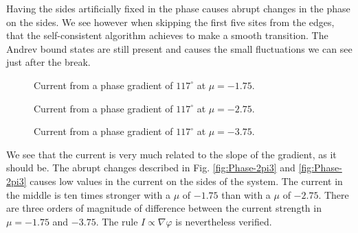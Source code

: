 \documentclass[..\main.tex]{subfile}
\begin{document}
Having the sides artificially fixed in the phase causes abrupt changes in the phase on the sides. We see however when skipping the first
 five sites from the edges, that the self-consistent
algorithm achieves to make a smooth transition. The Andrev bound states are still present and causes the small fluctuations we can see just after the
break.\\
\begin{figure}[H]
    
    \caption{Current from a phase gradient of $117^{\circ}$ at $\mu = -1.75$.}
\end{figure}
\begin{figure}[H]
    
    \caption{Current from a phase gradient of $117^{\circ}$ at $\mu = -2.75$.}
\end{figure}
\begin{figure}[H]
    
    \caption{Current from a phase gradient of $117^{\circ}$ at $\mu = -3.75$.}
\end{figure}

We see that the current is very much related to the slope of the gradient, as it should be. 
The abrupt changes described in Fig. \ref{fig:Phase-2pi3} and \ref{fig:Phase-2pi3} causes low values in the current on the sides of the system. 
The current in the middle is ten times stronger with a $\mu$ of $-1.75$ than with a $\mu$ of $-2.75$. There are three orders of magnitude
of difference between the current strength in $\mu = -1.75$ and $-3.75$. The rule $I\propto\nabla\varphi$ is nevertheless verified.\\
\end{document}

